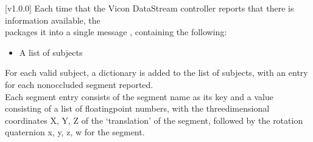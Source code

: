 [v1.0.0]
Each time that the Vicon DataStream controller reports that there is information
available, the\\
 packages it into a single message
\openSq{}\closeSq, containing the following:
\begin{itemize}
\item A list of subjects
\end{itemize}

For each valid subject, a dictionary \openSq{}\closeSq{} is added to the
list of subjects, with an entry for each non\longDash{}occluded segment reported.\\

Each segment entry consists of the segment name as its key and a value consisting of a
list of floating\longDash{}point numbers, with the three\longDash{}dimensional coordinates
\openSq{}X, Y, Z\closeSq{} of the `translation' of the segment, followed by the rotation
quaternion \openSq{}x, y, z, w\closeSq{} for the segment.
\primaryEnd{}
